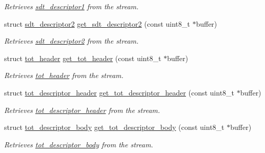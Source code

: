 \begin{DoxyCompactItemize}
\begin{DoxyCompactList}\small\item\em Retrieves \hyperlink{structsdt__descriptor1}{sdt\+\_\+descriptor1} from the stream. \end{DoxyCompactList}\item 
struct \hyperlink{structsdt__descriptor2}{sdt\+\_\+descriptor2} \hyperlink{group__structure_gaf3c5355cc1713bbc5648511e06058627}{get\+\_\+sdt\+\_\+descriptor2} (const uint8\+\_\+t $\ast$buffer)\hypertarget{group__structure_gaf3c5355cc1713bbc5648511e06058627}{}\label{group__structure_gaf3c5355cc1713bbc5648511e06058627}

\begin{DoxyCompactList}\small\item\em Retrieves \hyperlink{structsdt__descriptor2}{sdt\+\_\+descriptor2} from the stream. \end{DoxyCompactList}\item 
struct \hyperlink{structtot__header}{tot\+\_\+header} \hyperlink{group__structure_ga1a559bff189dc6665fbe0a18373868c0}{get\+\_\+tot\+\_\+header} (const uint8\+\_\+t $\ast$buffer)\hypertarget{group__structure_ga1a559bff189dc6665fbe0a18373868c0}{}\label{group__structure_ga1a559bff189dc6665fbe0a18373868c0}

\begin{DoxyCompactList}\small\item\em Retrieves \hyperlink{structtot__header}{tot\+\_\+header} from the stream. \end{DoxyCompactList}\item 
struct \hyperlink{structtot__descriptor__header}{tot\+\_\+descriptor\+\_\+header} \hyperlink{group__structure_gac4d9385a215e5da728266f73841f0db3}{get\+\_\+tot\+\_\+descriptor\+\_\+header} (const uint8\+\_\+t $\ast$buffer)\hypertarget{group__structure_gac4d9385a215e5da728266f73841f0db3}{}\label{group__structure_gac4d9385a215e5da728266f73841f0db3}

\begin{DoxyCompactList}\small\item\em Retrieves \hyperlink{structtot__descriptor__header}{tot\+\_\+descriptor\+\_\+header} from the stream. \end{DoxyCompactList}\item 
struct \hyperlink{structtot__descriptor__body}{tot\+\_\+descriptor\+\_\+body} \hyperlink{group__structure_ga4b0d2feed4e5af5e0a842dded06ef469}{get\+\_\+tot\+\_\+descriptor\+\_\+body} (const uint8\+\_\+t $\ast$buffer)\hypertarget{group__structure_ga4b0d2feed4e5af5e0a842dded06ef469}{}\label{group__structure_ga4b0d2feed4e5af5e0a842dded06ef469}

\begin{DoxyCompactList}\small\item\em Retrieves \hyperlink{structtot__descriptor__body}{tot\+\_\+descriptor\+\_\+body} from the stream. \end{DoxyCompactList}\end{DoxyCompactItemize}
